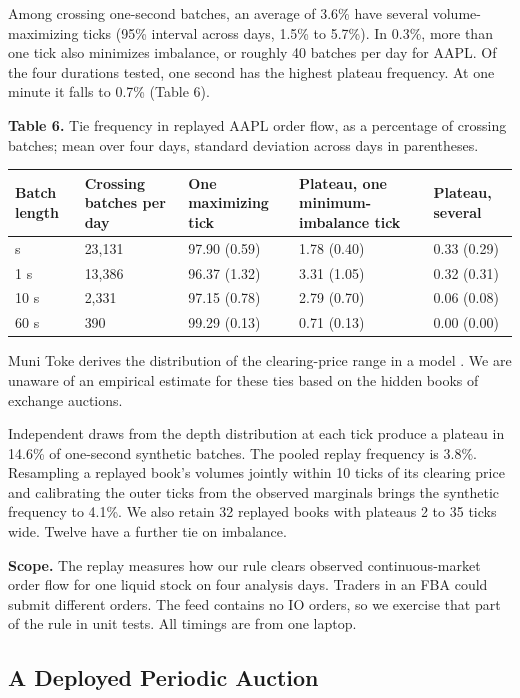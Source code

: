 Among crossing one-second batches, an average of 3.6\% have several volume-maximizing ticks (95\% interval across days, 1.5\% to 5.7\%). In 0.3\%, more than one tick also minimizes imbalance, or roughly 40 batches per day for AAPL. Of the four durations tested, one second has the highest plateau frequency. At one minute it falls to 0.7\% (Table 6).

\textbf{Table 6.} Tie frequency in replayed AAPL order flow, as a percentage of crossing batches; mean over four days, standard deviation across days in parentheses.

\begin{longtable}[]{@{}lllll@{}}
\toprule\noalign{}
Batch length & Crossing batches per day & One maximizing tick & Plateau, one minimum-imbalance tick & Plateau, several \\
\midrule\noalign{}
\endhead
\bottomrule\noalign{}
\endlastfoot
0.1 s & 23,131 & 97.90 (0.59) & 1.78 (0.40) & 0.33 (0.29) \\
1 s & 13,386 & 96.37 (1.32) & 3.31 (1.05) & 0.32 (0.31) \\
10 s & 2,331 & 97.15 (0.78) & 2.79 (0.70) & 0.06 (0.08) \\
60 s & 390 & 99.29 (0.13) & 0.71 (0.13) & 0.00 (0.00) \\
\end{longtable}

Muni Toke derives the distribution of the clearing-price range in a model \cite{munitoke2015}. We are unaware of an empirical estimate for these ties based on the hidden books of exchange auctions.

Independent draws from the depth distribution at each tick produce a plateau in 14.6\% of one-second synthetic batches. The pooled replay frequency is 3.8\%. Resampling a replayed book's volumes jointly within 10 ticks of its clearing price and calibrating the outer ticks from the observed marginals brings the synthetic frequency to 4.1\%. We also retain 32 replayed books with plateaus 2 to 35 ticks wide. Twelve have a further tie on imbalance.

\textbf{Scope.} The replay measures how our rule clears observed continuous-market order flow for one liquid stock on four analysis days. Traders in an FBA could submit different orders. The feed contains no IO orders, so we exercise that part of the rule in unit tests. All timings are from one laptop.

\subsection{A Deployed Periodic Auction}

